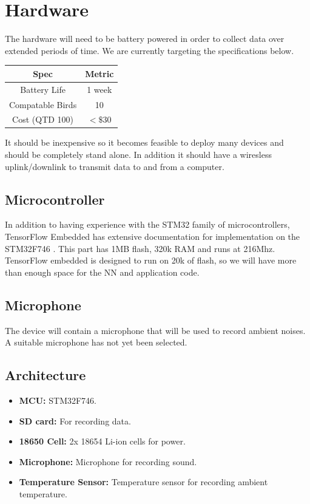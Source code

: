 \documentclass[12pt,journal,compsoc]{IEEEtran}
\begin{document}
\section{Hardware}
The hardware will need to be battery powered in order to collect data over extended periods of time. We are currently targeting the specifications below.

\begin{center}
\begin{tabular}{ c | c }
Spec             & Metric\\ 
\hline 
Battery Life     & 1 week\\
Compatable Birds & 10    \\
Cost (QTD 100)   & $<\$30$  \\
\end{tabular}
\end{center}

It should be inexpensive so it becomes feasible to deploy many devices and should be completely stand alone. In addition it should have a wiresless uplink/downlink to transmit data to and from a computer.

\subsection{Microcontroller}
In addition to having experience with the STM32 family of microcontrollers, TensorFlow Embedded \cite{TF} has extensive documentation for implementation on the STM32F746 \cite{STM}. This part has 1MB flash, 320k RAM and runs at 216Mhz. TensorFlow embedded is designed to run on 20k of flash, so we will have more than enough space for the NN and application code.

\subsection{Microphone}
The device will contain a microphone that will be used to record ambient noises. A suitable microphone has not yet been selected.

\subsection{Architecture}
\begin{itemize}
\item{\textbf{MCU:} STM32F746.}
\item{\textbf{SD card:} For recording data.}
\item{\textbf{18650 Cell:} 2x 18654 Li-ion cells for power.}
\item{\textbf{Microphone:} Microphone for recording sound.}
\item{\textbf{Temperature Sensor:} Temperature sensor for recording ambient temperature.}
\end{itemize}
\end{document}
